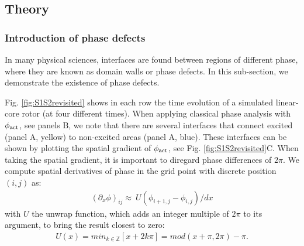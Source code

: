 \documentclass[aps,pre,amsfonts,amssymb,amsmath,twocolumn, superscriptaddress]{revtex4-1}
\newcommand{\phiact}{\ensuremath{\phi_{\rm act}}}
\begin{document}

\subsection{Theory}\label{sec:theory}

\subsubsection{Introduction of phase defects}

In many physical sciences, interfaces are found between regions of different phase, where they are known as domain walls or phase defects. In this sub-section, we demonstrate the existence of phase defects. 

Fig. \ref{fig:S1S2revisited} shows in each row the time evolution of a simulated linear-core rotor (at four different times). When applying classical phase analysis with $\phiact$, see panels B, we note that there are several interfaces that connect excited (panel A, yellow) to non-excited areas (panel A, blue). These interfaces can be shown by plotting the spatial gradient of $\phiact$, see Fig. \ref{fig:S1S2revisited}C. When taking the spatial gradient, it is important to diregard phase differences of $2\pi$. We compute spatial derivatives of phase in the grid point with discrete position $(i,j)$ as: 
\begin{align} 
(\partial_x \phi)_{ij} \approx \ U(\phi_{i+1,j} - \phi_{i,j})/dx
\end{align}
with $U$ the unwrap function, which adds an integer multiple of $2\pi$ to its argument, to bring the result closest to zero:
 \begin{align}
     U(x) = min_{k \in \mathbb{Z}} [ x + 2k \pi ] =  mod( x + \pi, 2\pi) - \pi.
 \end{align}
\end{document}
